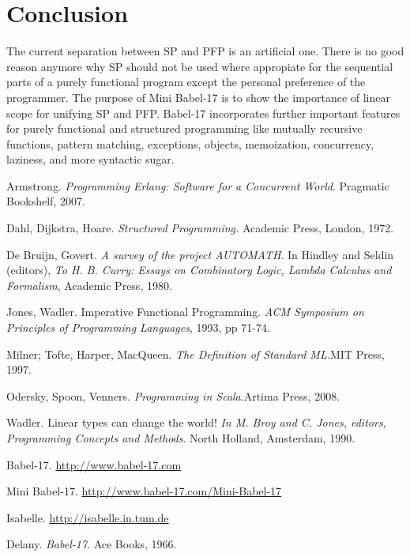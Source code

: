 \documentclass{llncs}
\begin{document}
\section{Conclusion}
The current separation between SP and PFP is an artificial one. There is no good reason anymore why SP should not be used where appropiate for the sequential parts of a purely functional program except the personal preference of the programmer.  The purpose of Mini Babel-17 is to show the importance of linear scope for unifying SP and PFP. Babel-17 incorporates further important features for purely functional and structured programming like mutually recursive functions, pattern matching, exceptions, objects, memoization, concurrency, laziness, and more syntactic sugar. 







\begin{thebibliography}{10}

Armstrong. \newblock\emph{Programming Erlang: Software for a Concurrent World}. \newblock Pragmatic Bookshelf, 2007.

Dahl, Dijkstra, Hoare. \newblock\emph{Structured Programming.} 
\newblock Academic Press, London, 1972.

De Bruijn, Govert. \newblock\emph{A survey of the project AUTOMATH}. \newblock  In Hindley and Seldin (editors), \emph{To H. B. Curry: Essays on Combinatory Logic, Lambda Calculus and Formalism}, Academic Press, 1980.

Jones, Wadler. \newblock Imperative Functional Programming. \newblock\emph{ACM Symposium on Principles of Programming Languages}, 1993, pp 71-74. 

Milner; Tofte, Harper, MacQueen. \newblock\emph{The Definition of Standard ML.}\newblock MIT Press, 1997.

Odersky, Spoon, Venners. \newblock\emph{Programming in Scala}.\newblock Artima Press, 2008.

 Wadler. \newblock Linear types can change the world! \newblock\emph{In M. Broy and C. Jones, editors, Programming Concepts and Methods}. North Holland, Amsterdam, 1990.

Babel-17. \newblock \url{http://www.babel-17.com}

Mini Babel-17. \newblock \url{http://www.babel-17.com/Mini-Babel-17}

Isabelle. \newblock \url{http://isabelle.in.tum.de}

Delany. \newblock\emph{Babel-17}. \newblock Ace Books, 1966.

\end{thebibliography}
\end{document}
